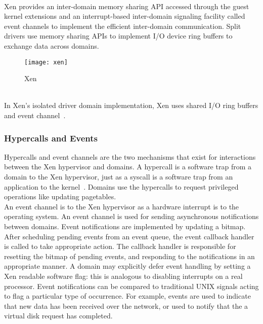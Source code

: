 \\[3mm]
Xen provides an inter-domain memory sharing API accessed through the guest kernel extensions and an interrupt-based inter-domain signaling facility called event channels to implement the efficient inter-domain communication. Split drivers use memory sharing APIs to implement I/O device ring buffers to exchange data across domains.
\begin{figure}[!h]
\centering
\texttt{[image: xen]}
\caption{Xen}
\label{xen}
\end{figure}
\\[3mm]
In Xen's isolated driver domain implementation, Xen uses shared I/O ring buffers and event channel~\cite{Barham:2003:XAV:1165389.945462, Nikolaev:2013:VOS:2517349.2522719, Ruslan}.

\subsubsection*{Hypercalls and Events}
Hypercalls and event channels are the two mechanisms that exist for interactions between the Xen hypervisor and domains. A hypercall is a software trap from a domain to the Xen hypervisor, just as a syscall is a software trap from an application to the kernel~\cite{hypercall}. Domains use the hypercalls to request privileged operations like updating pagetables. 
\\[3mm]
An event channel is to the Xen hypervisor as a hardware interrupt is to the operating system. An event channel is used for sending asynchronous notifications between domains. Event notifications are implemented by updating a bitmap. After scheduling pending events from an event queue, the event callback handler is called to take appropriate action. The callback handler is responsible for resetting the bitmap of pending events, and responding to the notifications in an appropriate manner. A domain may explicitly defer event handling by setting a Xen readable software flag: this is analogous to disabling interrupts on a real processor. Event notifications can be compared to traditional UNIX signals acting to flag a particular type of occurrence. For example, events are used to indicate that new data has been received over the network, or used to notify that the a virtual disk request has completed. 

